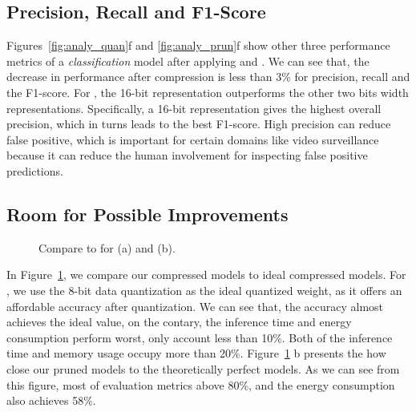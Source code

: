 \subsection{Precision, Recall and F1-Score}

Figures~\ref{fig:analy_quan}f and \ref{fig:analy_prun}f show other three performance metrics of a \emph{classification} model after
applying \quantization and \pruning. We can see that, the decrease in performance after compression is  less than 3\% for precision, recall
and the F1-score. For \quantization, the 16-bit representation outperforms the other two bits width representations. Specifically,  a
16-bit representation gives the highest overall precision, which in turns leads to the best F1-score. High precision can reduce false
positive, which is important for certain domains like video surveillance because it can reduce the human involvement for inspecting false
positive predictions.



\subsection{Room for Possible Improvements\label{sec:single}}

\begin{figure}[!t]
\centering

\hfill
{}
\hfill

\caption{Compare to  for \quantization (a) and \pruning (b).} \label{fig:oracle}
\end{figure}


In Figure~\ref{fig:oracle}, we compare our compressed models to ideal compressed models.
For \quantization, we use the 8-bit data quantization as the ideal
quantized weight,
as it offers an affordable accuracy after quantization.
We can see that,  the accuracy almost achieves the ideal value, on the
contary, the inference time and energy consumption perform worst, only account less than 10\%. Both of the inference time and memory usage
occupy more than 20\%. Figure~\ref{fig:oracle} b presents the how close our pruned models to the theoretically perfect models. As we can
see from this figure, most of evaluation metrics above 80\%, and the energy consumption also achieves 58\%.

